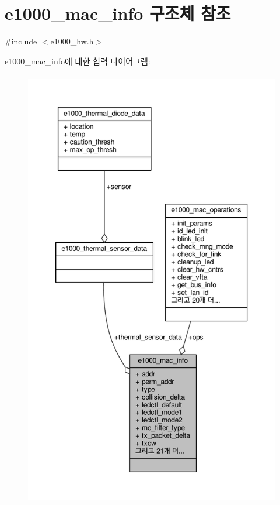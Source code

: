\hypertarget{structe1000__mac__info}{}\section{e1000\+\_\+mac\+\_\+info 구조체 참조}
\label{structe1000__mac__info}


{\ttfamily \#include $<$e1000\+\_\+hw.\+h$>$}



e1000\+\_\+mac\+\_\+info에 대한 협력 다이어그램\+:
\nopagebreak
\begin{figure}[H]
\begin{center}
\leavevmode
\includegraphics[height=550pt]{structe1000__mac__info__coll__graph}
\end{center}
\end{figure}

